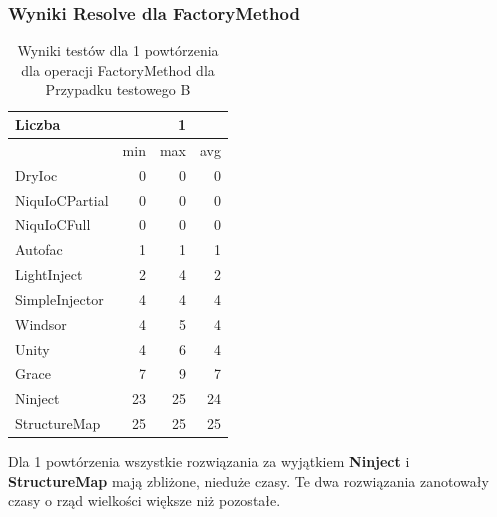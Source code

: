 \documentclass[12pt]{article}
\begin{document}
\subsubsection{Wyniki Resolve dla FactoryMethod}
\begin{table}[H]
\captionsetup{belowskip=0pt,aboveskip=0pt}
\begin{center}
\begin{small}
	\begin{tabular}{ | l | r r r | }
    		\hline
Liczba & & 1 & \\ \hline
 & min & max & avg \\ \hline
DryIoc & 0 & 0 & 0 \\ \hline
NiquIoCPartial & 0 & 0 & 0 \\ \hline
NiquIoCFull & 0 & 0 & 0 \\ \hline
Autofac & 1 & 1 & 1 \\ \hline
LightInject & 2 & 4 & 2 \\ \hline
SimpleInjector & 4 & 4 & 4 \\ \hline
Windsor & 4 & 5 & 4 \\ \hline
Unity & 4 & 6 & 4 \\ \hline
Grace & 7 & 9 & 7 \\ \hline
Ninject & 23 & 25 & 24 \\ \hline
StructureMap & 25 & 25 & 25 \\ \hline
  	\end{tabular}
\end{small}
\end{center}
\caption{Wyniki testów dla 1 powtórzenia dla operacji FactoryMethod dla Przypadku testowego B}
\label{TestCaseB_FactoryMethod1}
\end{table}
Dla 1 powtórzenia wszystkie rozwiązania za wyjątkiem \textbf{Ninject} i \textbf{StructureMap} mają zbliżone, nieduże czasy. Te dwa rozwiązania zanotowały czasy o rząd wielkości większe niż pozostałe.
\\
\end{document}

